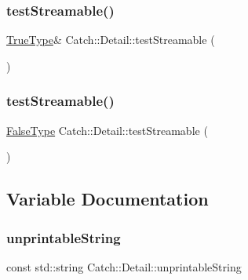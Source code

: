 \subsubsection{\texorpdfstring{test\+Streamable()}{testStreamable()}\hspace{0.1cm}{\footnotesize\ttfamily [1/2]}}
{\footnotesize\ttfamily \hyperlink{struct_catch_1_1_detail_1_1_true_type}{True\+Type}\& Catch\+::\+Detail\+::test\+Streamable (\begin{DoxyParamCaption}\item[{std\+::ostream \&}]{ }\end{DoxyParamCaption})}

\hypertarget{namespace_catch_1_1_detail_aac81f01b0d687f75b8f24a925591b7ac}{}\label{namespace_catch_1_1_detail_aac81f01b0d687f75b8f24a925591b7ac} 
\subsubsection{\texorpdfstring{test\+Streamable()}{testStreamable()}\hspace{0.1cm}{\footnotesize\ttfamily [2/2]}}
{\footnotesize\ttfamily \hyperlink{struct_catch_1_1_detail_1_1_false_type}{False\+Type} Catch\+::\+Detail\+::test\+Streamable (\begin{DoxyParamCaption}\item[{\hyperlink{struct_catch_1_1_detail_1_1_false_type}{False\+Type}}]{ }\end{DoxyParamCaption})}



\subsection{Variable Documentation}
\hypertarget{namespace_catch_1_1_detail_a466775f4eec29ffef29ab334cd885136}{}\label{namespace_catch_1_1_detail_a466775f4eec29ffef29ab334cd885136} 
\subsubsection{\texorpdfstring{unprintable\+String}{unprintableString}}
{\footnotesize\ttfamily const std\+::string Catch\+::\+Detail\+::unprintable\+String}

